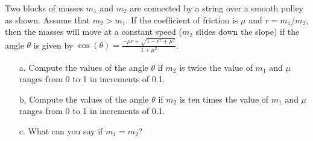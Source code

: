 {Two blocks of masses $m_1$ and $m_2$ are connected by a string over a smooth pulley as shown.  Assume that $m_2>m_1$.  If the coefficient of friction is $\mu$ and $r=m_1/m_2$, then the masses will move at a constant speed ($m_2$ slides down the slope) if the angle $\theta$ is given by $\displaystyle \cos(\theta) = \frac{-\mu r + \sqrt{1-r^2+\mu^2}}{1+\mu^2}$.


\begin{center}
\end{center}

\begin{itemize}
\item[a.] Compute the values of the angle $\theta$ if $m_2$ is twice the value of $m_1$ and $\mu$ ranges from 0 to 1 in increments of 0.1.
\item[b.] Compute the values of the angle $\theta$ if $m_2$ is ten times the value of $m_1$ and $\mu$ ranges from 0 to 1 in increments of 0.1.
\item[c.] What can you say if $m_1=m_2$?
\end{itemize}
}{}



%